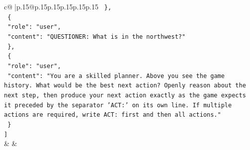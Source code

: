 \documentclass{article}
\begin{document}
{\begin{supertabular}{c@{$\;$}|p{.15\linewidth}@{}p{.15\linewidth}p{.15\linewidth}p{.15\linewidth}p{.15\linewidth}p{.15\linewidth}}
{{{\texttt{  \},} \\
\texttt{  \{} \\
\texttt{    "role": "user",} \\
\texttt{    "content": "QUESTIONER: What is in the northwest?"} \\
\texttt{  \},} \\
\texttt{  \{} \\
\texttt{    "role": "user",} \\
\texttt{    "content": "You are a skilled planner. Above you see the game history. What would be the best next action? Openly reason about the next step, then produce your next action exactly as the game expects it preceded by the separator 'ACT:' on its own line. If multiple actions are required, write ACT: first and then all actions."} \\
\texttt{  \}} \\
\texttt{{]}} \\
            }
        }
    }
    & & \\ \\


\end{supertabular}}
\end{document}
